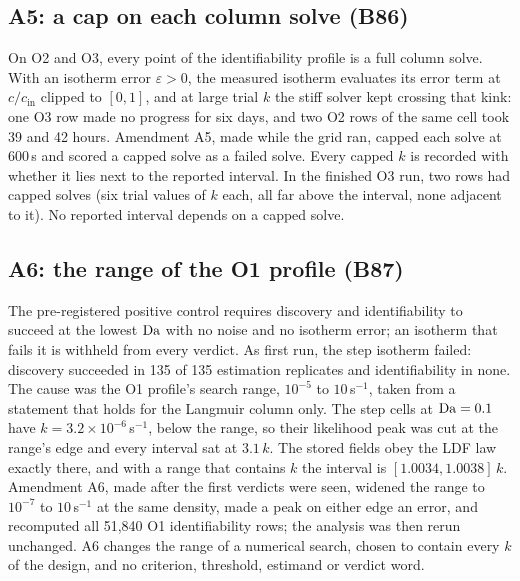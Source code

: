 \subsection*{A5: a cap on each column solve (B86)}
On O2 and O3, every point of the identifiability profile is a full column solve. With an
isotherm error $\varepsilon > 0$, the measured isotherm evaluates its error term at
$c/c_{\mathrm{in}}$ clipped to $[0, 1]$, and at large trial $k$ the stiff solver kept crossing
that kink: one O3 row made no progress for six days, and two O2 rows of the same cell took 39
and 42 hours. Amendment A5, made while the grid ran, capped each solve at 600\,s and scored a
capped solve as a failed solve. Every capped $k$ is recorded with whether it lies next to the
reported interval. In the finished O3 run, two rows had capped solves (six trial values of $k$
each, all far above the interval, none adjacent to it). No reported interval depends on a
capped solve.

\subsection*{A6: the range of the O1 profile (B87)}
The pre-registered positive control requires discovery and identifiability to succeed at the
lowest $\mathrm{Da}$ with no noise and no isotherm error; an isotherm that fails it is withheld from
every verdict. As first run, the step isotherm failed: discovery succeeded in 135 of 135
estimation replicates and identifiability in none. The cause was the O1 profile's search range,
$10^{-5}$ to $10$\,s$^{-1}$, taken from a statement that holds for the Langmuir column only.
The step cells at $\mathrm{Da} = 0.1$ have $k = 3.2\times10^{-6}$\,s$^{-1}$, below the range, so their
likelihood peak was cut at the range's edge and every interval sat at $3.1\,k$. The stored
fields obey the LDF law exactly there, and with a range that contains $k$ the interval is
$[1.0034, 1.0038]\,k$. Amendment A6, made after the first verdicts were seen, widened the range
to $10^{-7}$ to $10$\,s$^{-1}$ at the same density, made a peak on either edge an error, and
recomputed all 51,840 O1 identifiability rows; the analysis was then rerun unchanged. A6
changes the range of a numerical search, chosen to contain every $k$ of the design, and no
criterion, threshold, estimand or verdict word.

